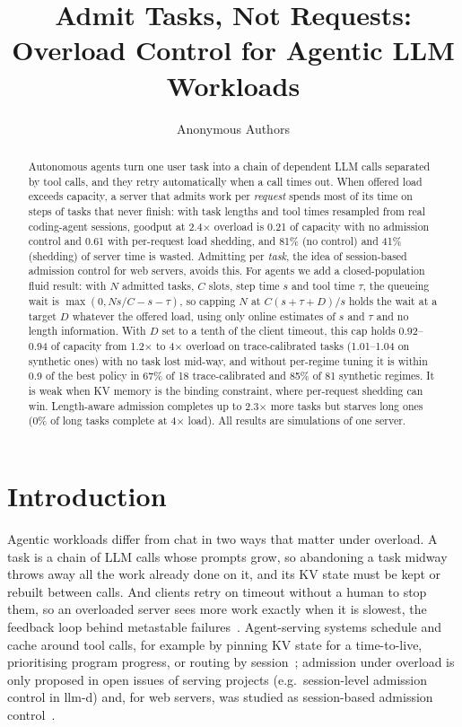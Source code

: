 \documentclass[10pt,twocolumn,letterpaper]{article}
\title{Admit Tasks, Not Requests: Overload Control for Agentic LLM Workloads}
\author{Anonymous Authors}
\date{}
\begin{document}
\maketitle
\begin{abstract}
Autonomous agents turn one user task into a chain of dependent LLM calls separated by tool calls,
and they retry automatically when a call times out. When offered load exceeds capacity, a server that admits work
per \emph{request} spends most of its time on steps of tasks that never finish: with task lengths and tool times resampled from real
coding-agent sessions, goodput at 2.4$\times$ overload is 0.21 of capacity with no admission control and 0.61 with per-request load shedding,
and 81\% (no control) and 41\% (shedding) of server time is wasted. Admitting per \emph{task}, the idea of session-based admission control for web servers,
avoids this. For agents we add a closed-population fluid result: with $N$ admitted tasks, $C$ slots, step time $s$ and tool time $\tau$, the queueing wait is
$\max(0,Ns/C-s-\tau)$, so capping $N$ at $C(s+\tau+D)/s$ holds the wait at a target $D$ whatever the offered load, using only online estimates of $s$ and $\tau$ and no length
information. With $D$ set to a tenth of the client timeout, this cap holds 0.92--0.94 of capacity from 1.2$\times$ to 4$\times$ overload on trace-calibrated tasks (1.01--1.04 on synthetic ones)
with no task lost mid-way, and without per-regime tuning it is within 0.9 of the best policy in 67\% of 18 trace-calibrated and 85\% of 81 synthetic regimes. It is weak when KV memory is the binding constraint,
where per-request shedding can win. Length-aware admission completes up to 2.3$\times$ more tasks but starves long ones (0\% of long tasks complete at 4$\times$ load).
All results are simulations of one server.
\end{abstract}

\section{Introduction}
Agentic workloads differ from chat in two ways that matter under overload. A task is a chain of LLM calls whose
prompts grow, so abandoning a task midway throws away all the work already done on it, and its KV state must be
kept or rebuilt between calls. And clients retry on timeout without a human to stop them, so an overloaded server sees more
work exactly when it is slowest, the feedback loop behind metastable failures~\citep{bronson2021metastable,huang2022metastable}.
Agent-serving systems schedule and cache around tool calls, for example by pinning KV state for a time-to-live, prioritising program
progress, or routing by session~\citep{continuum2025,tokencake2025,saga2026,cachewise2026,smetric2026,talaria2026}; admission under overload is
only proposed in open issues of serving projects (e.g.\ session-level admission control in llm-d) and, for web servers, was studied as session-based admission control~\citep{cherkasova2002sbac}.
\end{document}
